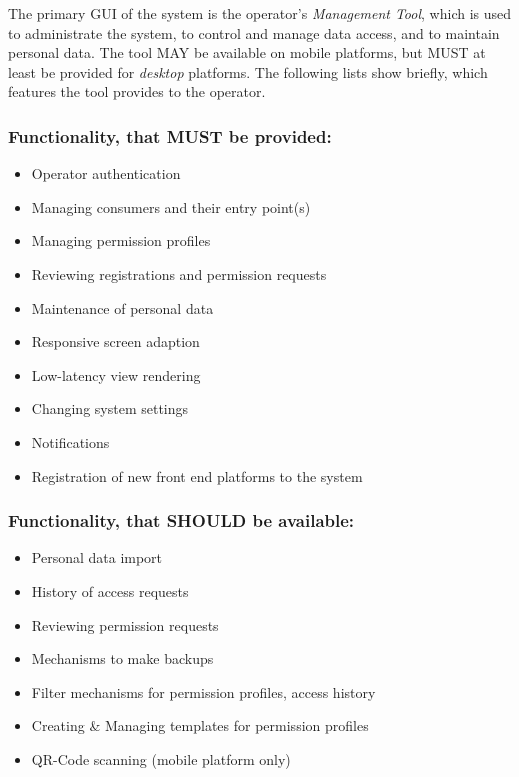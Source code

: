 \documentclass[12pt,english,a4paper,titlepage,cleardoublepage=empty,dottedtoc]{report}
\providecommand{\tightlist}{%
  \setlength{\itemsep}{0pt}\setlength{\parskip}{0pt}}
\begin{document}
The primary GUI of the system is the operator's \emph{Management Tool},
which is used to administrate the system, to control and manage data
access, and to maintain personal data. The tool MAY be available on
mobile platforms, but MUST at least be provided for \emph{desktop}
platforms. The following lists show briefly, which features the tool
provides to the operator.

\subsubsection{Functionality, that MUST be
provided:}\label{functionality-that-must-be-provided}

\begin{itemize}
\tightlist
\item
  Operator authentication
\item
  Managing consumers and their entry point(s)
\item
  Managing permission profiles
\item
  Reviewing registrations and permission requests
\item
  Maintenance of personal data
\item
  Responsive screen adaption
\item
  Low-latency view rendering
\item
  Changing system settings
\item
  Notifications
\item
  Registration of new front end platforms to the system
\end{itemize}

\subsubsection{Functionality, that SHOULD be
available:}\label{functionality-that-should-be-available}

\begin{itemize}
\tightlist
\item
  Personal data import
\item
  History of access requests
\item
  Reviewing permission requests
\item
  Mechanisms to make backups
\item
  Filter mechanisms for permission profiles, access history
\item
  Creating \& Managing templates for permission profiles
\item
  QR-Code scanning (mobile platform only)
\end{itemize}
\end{document}
